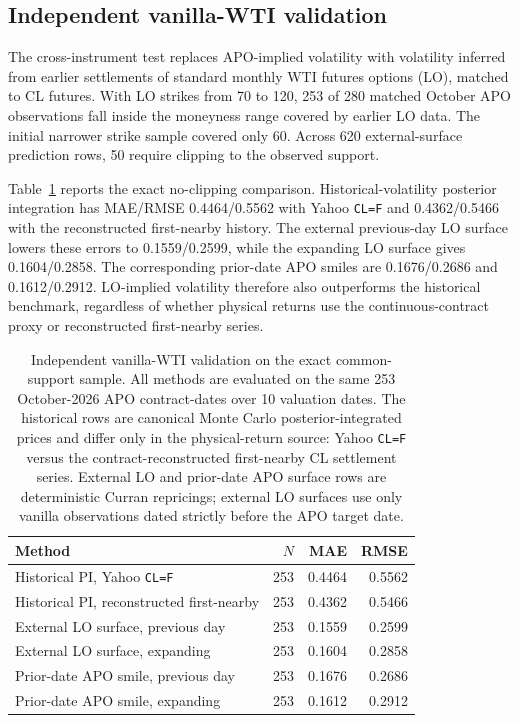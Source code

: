 \subsection{Independent vanilla-WTI validation}\label{sec:external_lo_results}

The cross-instrument test replaces APO-implied volatility with volatility inferred from earlier settlements of standard monthly WTI futures options (LO), matched to CL futures. With LO strikes from 70 to 120, 253 of 280 matched October APO observations fall inside the moneyness range covered by earlier LO data. The initial narrower strike sample covered only 60. Across 620 external-surface prediction rows, 50 require clipping to the observed support.

Table~\ref{tab:external_lo} reports the exact no-clipping comparison. Historical-volatility posterior integration has MAE/RMSE 0.4464/0.5562 with Yahoo \texttt{CL=F} and 0.4362/0.5466 with the reconstructed first-nearby history. The external previous-day LO surface lowers these errors to 0.1559/0.2599, while the expanding LO surface gives 0.1604/0.2858. The corresponding prior-date APO smiles are 0.1676/0.2686 and 0.1612/0.2912. LO-implied volatility therefore also outperforms the historical benchmark, regardless of whether physical returns use the continuous-contract proxy or reconstructed first-nearby series.

\begin{table}[t]
\centering
\caption{Independent vanilla-WTI validation on the exact common-support sample. All methods are evaluated on the same 253 October-2026 APO contract-dates over 10 valuation dates. The historical rows are canonical Monte Carlo posterior-integrated prices and differ only in the physical-return source: Yahoo \texttt{CL=F} versus the contract-reconstructed first-nearby CL settlement series. External LO and prior-date APO surface rows are deterministic Curran repricings; external LO surfaces use only vanilla observations dated strictly before the APO target date.}\label{tab:external_lo}
\begin{tabular}{lrrr}
\toprule
Method & $N$ & MAE & RMSE\\
\midrule
Historical PI, Yahoo \texttt{CL=F} & 253 & 0.4464 & 0.5562\\
Historical PI, reconstructed first-nearby & 253 & 0.4362 & 0.5466\\
External LO surface, previous day & 253 & 0.1559 & 0.2599\\
External LO surface, expanding & 253 & 0.1604 & 0.2858\\
Prior-date APO smile, previous day & 253 & 0.1676 & 0.2686\\
Prior-date APO smile, expanding & 253 & 0.1612 & 0.2912\\
\bottomrule
\end{tabular}
\end{table}


